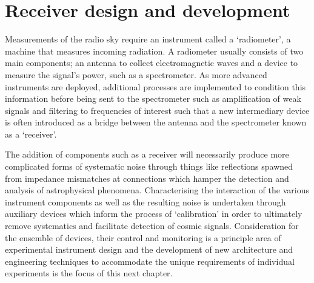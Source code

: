 \chapter{Receiver design and development}\label{chap:instrumentation}

\ifpdf
    \graphicspath{{instrumentation/figs/Raster/}{instrumentation/figs/PDF/}{instrumentation/figs/}}
\else
    \graphicspath{{instrumentation/figs/Vector/}{instrumentation/figs/}}
\fi

Measurements of the radio sky require an instrument called a ‘radiometer’, a machine that measures incoming radiation. A radiometer usually consists of two main components; an antenna to collect electromagnetic waves and a device to measure the signal's power, such as a spectrometer. As more advanced instruments are deployed, additional processes are implemented to condition this information before being sent to the spectrometer such as amplification of weak signals and filtering to frequencies of interest such that a new intermediary device is often introduced as a bridge between the antenna and the spectrometer known as a ‘receiver’.

The addition of components such as a receiver will necessarily produce more complicated forms of systematic noise through things like reflections spawned from impedance mismatches at connections which hamper the detection and analysis of astrophysical phenomena. Characterising the interaction of the various instrument components as well as the resulting noise is undertaken through auxiliary devices which inform the process of ‘calibration’ in order to ultimately remove systematics and facilitate detection of cosmic signals. Consideration for the ensemble of devices, their control and monitoring is a principle area of experimental instrument design and the development of new architecture and engineering techniques to accommodate the unique requirements of individual experiments is the focus of this next chapter.


